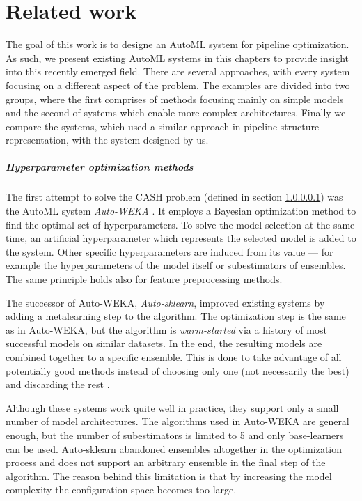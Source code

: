 \chapter{Related work} \label{ch2:related}
The goal of this work is to designe an AutoML system for pipeline optimization.
As such, we present existing AutoML systems in this chapters to provide insight
into this recently emerged field. There are several approaches, with every system
focusing on a different aspect of the problem. The examples are divided into
two groups, where the first comprises of methods focusing mainly on simple
models and the second of systems which enable more complex architectures.
Finally we compare the systems, which used a similar approach in
pipeline structure representation, with the system designed by us.

\paragraph{Hyperparameter optimization methods} \label{CASH}
The first attempt to solve the CASH problem (defined in section \ref{CASH})
was the AutoML system \emph{Auto-WEKA}
\citep{DBLP:journals/corr/abs-1208-3719}. It employs a Bayesian optimization
method to find the optimal set of hyperparameters. To solve the model selection
at the same time, an artificial hyperparameter which represents the selected
model is added to the system. Other specific hyperparameters are induced from its
value --- for example the hyperparameters of the model itself or subestimators of
ensembles. The same principle holds also for feature preprocessing methods.

The successor of Auto-WEKA, \emph{Auto-sklearn}, improved existing systems by
adding a metalearning step to the algorithm. The optimization step is the same
as in Auto-WEKA, but the algorithm is \emph{warm-started} via a history of most
successful models on similar datasets. In the end, the resulting models are
combined together to a specific ensemble. This is done to take advantage of all
potentially good methods instead of choosing only one (not necessarily the best)
and discarding the rest \citep{Feurer:2015:ERA:2969442.2969547}.

Although these systems work quite well in practice, they support only a small
number of model architectures. The algorithms used in Auto-WEKA are general
enough, but the number of subestimators is limited to 5 and only base-learners can
be used. Auto-sklearn abandoned ensembles altogether in the optimization process
and does not support an arbitrary ensemble in the final step of the algorithm.
The reason behind this limitation is that by increasing the model complexity the
configuration space becomes too large.

